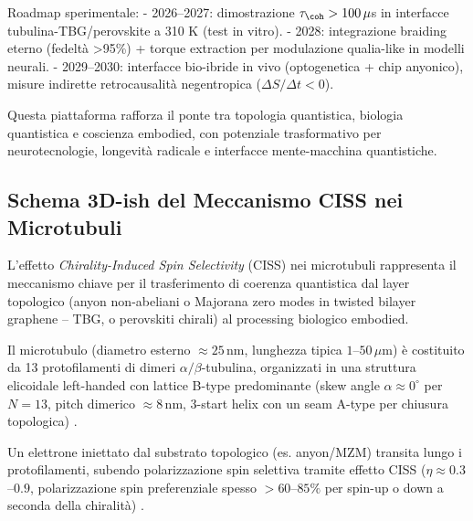 \documentclass[11pt,a4paper]{article}
\let\oldcite\cite
\renewcommand{\cite}{\protect\oldcite}
\theoremstyle{plain}
\theoremstyle{definition}
\begin{document}
Roadmap sperimentale:
- 2026–2027: dimostrazione $\tau_{\coh} > 100\,\mu$s in interfacce tubulina-TBG/perovskite a 310 K (test in vitro).
- 2028: integrazione braiding eterno (fedeltà >95\%) + torque extraction per modulazione qualia-like in modelli neurali.
- 2029–2030: interfacce bio-ibride in vivo (optogenetica + chip anyonico), misure indirette retrocausalità negentropica ($\Delta S / \Delta t < 0$).

Questa piattaforma rafforza il ponte tra topologia quantistica, biologia quantistica e coscienza embodied, con potenziale trasformativo per neurotecnologie, longevità radicale e interfacce mente-macchina quantistiche.




















\subsection{Schema 3D-ish del Meccanismo CISS nei Microtubuli}

L'effetto \textit{Chirality-Induced Spin Selectivity} (CISS) nei microtubuli rappresenta il meccanismo chiave per il trasferimento di coerenza quantistica dal layer topologico (anyon non-abeliani o Majorana zero modes in twisted bilayer graphene -- TBG, o perovskiti chirali) al processing biologico embodied.

\vspace{0.4cm}

Il microtubulo (diametro esterno $\approx 25\,\mathrm{nm}$, lunghezza tipica $1$--$50\,\mu\mathrm{m}$) è costituito da 13 protofilamenti di dimeri $\alpha/\beta$-tubulina, organizzati in una struttura elicoidale left-handed con lattice B-type predominante (skew angle $\alpha \approx 0^\circ$ per $N=13$, pitch dimerico $\approx 8\,\mathrm{nm}$, 3-start helix con un seam A-type per chiusura topologica) \cite{chaaban2017microtubule, rohmer2025chiral}.

Un elettrone iniettato dal substrato topologico (es. anyon/MZM) transita lungo i protofilamenti, subendo polarizzazione spin selettiva tramite effetto CISS ($\eta \approx 0.3$--$0.9$, polarizzazione spin preferenziale spesso $>60$--$85\%$ per spin-up o down a seconda della chiralità) \cite{naaman2019spin, naaman2020spin, miwa2025spin, sala2026spin}.
\end{document}
